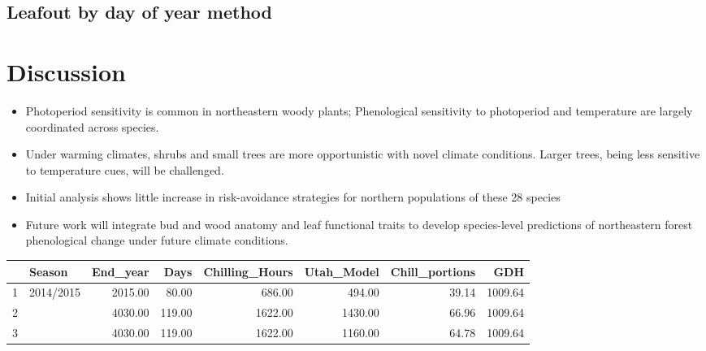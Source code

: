 \documentclass[11pt]{article}
\begin{document}
\subsection{Leafout by day of year method}


 

\section{Discussion}

\begin{itemize}

\item{Photoperiod sensitivity is common in northeastern woody plants; Phenological sensitivity to photoperiod and temperature are largely coordinated across species.}
\item{Under warming climates, shrubs and small trees are more opportunistic with novel climate conditions. Larger trees, being less sensitive to temperature cues, will be challenged. }
\item{Initial analysis shows little increase in risk-avoidance strategies for northern populations of these 28 species}
\item{Future work will integrate bud and wood anatomy and leaf functional traits to develop species-level predictions of northeastern forest phenological change under future climate conditions.}
\end{itemize}



\begin{table}[ht]
\centering
\begin{tabular}{rlrrrrrr}
  \hline
 & Season & End\_year & Days & Chilling\_Hours & Utah\_Model & Chill\_portions & GDH \\ 
  \hline
1 & 2014/2015 & 2015.00 & 80.00 & 686.00 & 494.00 & 39.14 & 1009.64 \\ 
  2 &  & 4030.00 & 119.00 & 1622.00 & 1430.00 & 66.96 & 1009.64 \\ 
  3 &  & 4030.00 & 119.00 & 1622.00 & 1160.00 & 64.78 & 1009.64 \\ 
   \hline
\end{tabular}
\end{table}
\end{document}
